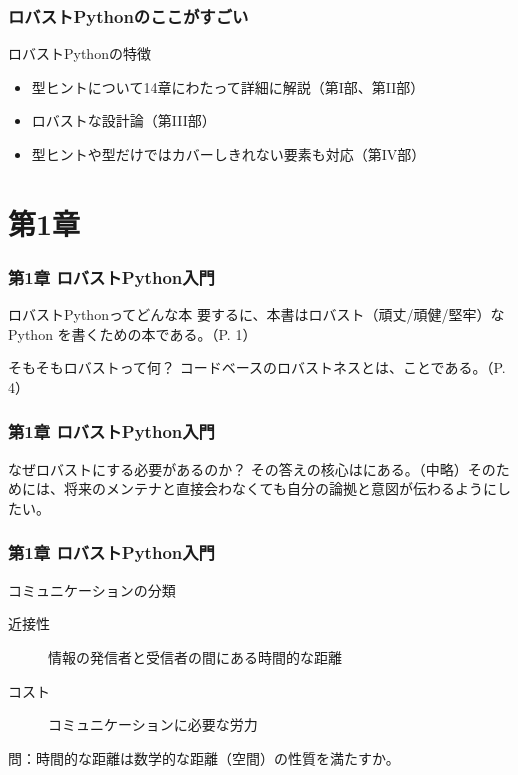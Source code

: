 \documentclass[aspectratio=169,dvipdfmx,14pt,notheorems]{beamer}
\theoremstyle{definition}
\begin{document}
\begin{frame}\frametitle{ロバストPythonのここがすごい}

\begin{block}{ロバストPythonの特徴}
\begin{itemize}
\item 型ヒントについて14章にわたって詳細に解説（第I部、第II部）
\item ロバストな設計論（第III部）
\item 型ヒントや型だけではカバーしきれない要素も対応（第IV部）
\end{itemize}
\end{block}
\end{frame}

\section{第1章}

\begin{frame}\frametitle{第1章 ロバストPython入門}

\begin{block}{ロバストPythonってどんな本}
要するに、本書はロバスト（頑丈/頑健/堅牢）なPython を書くための本である。（P. 1）
\end{block}

\begin{exampleblock}{そもそもロバストって何？}
コードベースのロバストネスとは、ことである。（P. 4）
\end{exampleblock}

\end{frame}

\begin{frame}\frametitle{第1章 ロバストPython入門}

\begin{block}{なぜロバストにする必要があるのか？}
その答えの核心はにある。（中略）そのためには、将来のメンテナと直接会わなくても自分の論拠と意図が伝わるようにしたい。
\end{block}

\end{frame}

\begin{frame}\frametitle{第1章 ロバストPython入門}

\begin{block}{コミュニケーションの分類}
\begin{description}
\item[近接性] 情報の発信者と受信者の間にある時間的な距離
\item[コスト] コミュニケーションに必要な労力
\end{description}
\end{block}
問：時間的な距離は数学的な距離（空間）の性質を満たすか。
\end{frame}
\end{document}
